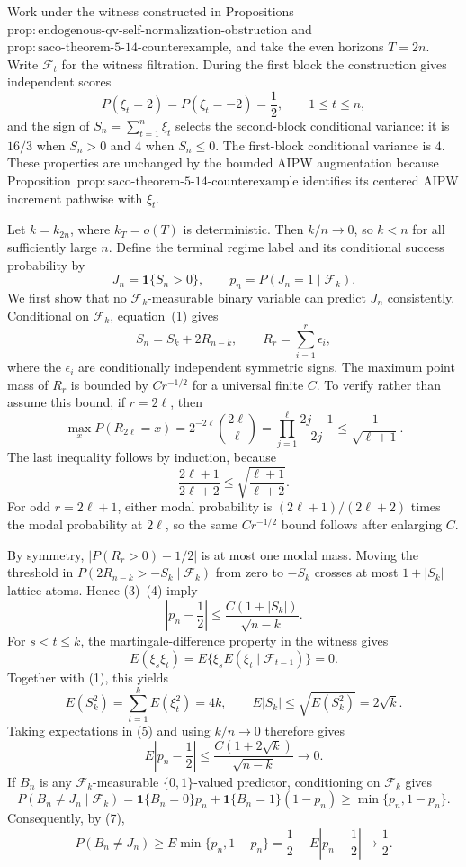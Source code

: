Work under the witness constructed in Propositions~\(\mathrm{prop:endogenous\text{-}qv\text{-}self\text{-}normalization\text{-}obstruction}\) and~\(\mathrm{prop:saco\text{-}theorem\text{-}5\text{-}14\text{-}counterexample}\), and take the even horizons \(T=2n\).  Write \(\mathcal F_t\) for the witness filtration.  During the first block the construction gives independent scores
\[
 P(\xi_t=2)=P(\xi_t=-2)=\frac12,
 \qquad 1\le t\le n,
\tag{1}
\]
and the sign of \(S_n=\sum_{t=1}^n\xi_t\) selects the second-block conditional variance: it is \(16/3\) when \(S_n>0\) and \(4\) when \(S_n\le0\).  The first-block conditional variance is \(4\).  These properties are unchanged by the bounded AIPW augmentation because Proposition~\(\mathrm{prop:saco\text{-}theorem\text{-}5\text{-}14\text{-}counterexample}\) identifies its centered AIPW increment pathwise with \(\xi_t\).

Let \(k=k_{2n}\), where \(k_T=o(T)\) is deterministic.  Then \(k/n\to0\), so \(k<n\) for all sufficiently large \(n\).  Define the terminal regime label and its conditional success probability by
\[
 J_n=\mathbf 1\{S_n>0\},
 \qquad
 p_n=P(J_n=1\mid\mathcal F_k).
\tag{2}
\]
We first show that no \(\mathcal F_k\)-measurable binary variable can predict \(J_n\) consistently.  Conditional on \(\mathcal F_k\), equation~(1) gives
\[
 S_n=S_k+2R_{n-k},
 \qquad
 R_r=\sum_{i=1}^r\epsilon_i,
\tag{3}
\]
where the \(\epsilon_i\) are conditionally independent symmetric signs.  The maximum point mass of \(R_r\) is bounded by \(C r^{-1/2}\) for a universal finite \(C\).  To verify rather than assume this bound, if \(r=2\ell\), then
\[
 \max_xP(R_{2\ell}=x)
 =2^{-2\ell}\binom{2\ell}{\ell}
 =\prod_{j=1}^{\ell}\frac{2j-1}{2j}
 \le\frac1{\sqrt{\ell+1}}.
\tag{4}
\]
The last inequality follows by induction, because
\[
 \frac{2\ell+1}{2\ell+2}
 \le \sqrt{\frac{\ell+1}{\ell+2}}.
\]
For odd \(r=2\ell+1\), either modal probability is \((2\ell+1)/(2\ell+2)\) times the modal probability at \(2\ell\), so the same \(Cr^{-1/2}\) bound follows after enlarging \(C\).

By symmetry, \(|P(R_r>0)-1/2|\) is at most one modal mass.  Moving the threshold in \(P(2R_{n-k}>-S_k\mid\mathcal F_k)\) from zero to \(-S_k\) crosses at most \(1+|S_k|\) lattice atoms.  Hence (3)--(4) imply
\[
 \left|p_n-\frac12\right|
 \le \frac{C(1+|S_k|)}{\sqrt{n-k}}.
\tag{5}
\]
For \(s<t\le k\), the martingale-difference property in the witness gives
\[
 E(\xi_s\xi_t)
 =E\{\xi_sE(\xi_t\mid\mathcal F_{t-1})\}=0.
\]
Together with (1), this yields
\[
 E(S_k^2)=\sum_{t=1}^kE(\xi_t^2)=4k,
 \qquad
 E|S_k|\le\sqrt{E(S_k^2)}=2\sqrt{k}.
\tag{6}
\]
Taking expectations in (5) and using \(k/n\to0\) therefore gives
\[
 E\left|p_n-\frac12\right|
 \le \frac{C(1+2\sqrt{k})}{\sqrt{n-k}}
 \longrightarrow0.
\tag{7}
\]
If \(B_n\) is any \(\mathcal F_k\)-measurable \(\{0,1\}\)-valued predictor, conditioning on \(\mathcal F_k\) gives
\[
 P(B_n\ne J_n\mid\mathcal F_k)
 =\mathbf1\{B_n=0\}p_n+
   \mathbf1\{B_n=1\}(1-p_n)
 \ge \min\{p_n,1-p_n\}.
\]
Consequently, by (7),
\[
 P(B_n\ne J_n)
 \ge E\min\{p_n,1-p_n\}
 =\frac12-E\left|p_n-\frac12\right|
 \longrightarrow\frac12.
\tag{8}
\]

